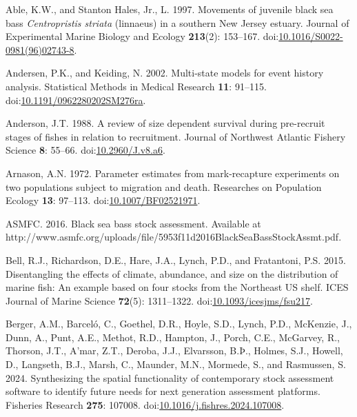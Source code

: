 \documentclass[
]{article}
\newlength{\cslhangindent}
\newlength{\cslentryspacingunit} %
\newenvironment{CSLReferences}[2] %
 {%
  \setlength{\parindent}{0pt}
  \ifodd #1
  \let\oldpar\par
  \def\par{\hangindent=\cslhangindent\oldpar}
  \fi
  \setlength{\parskip}{#2\cslentryspacingunit}
 }%
 {}
\begin{document}
\hypertarget{refs}{}
\begin{CSLReferences}{1}{0}
\leavevmode{}%
Able, K.W., and Stanton Hales, Jr., L. 1997. Movements of juvenile black sea bass \emph{{C}entropristis striata} (linnaeus) in a southern {N}ew {J}ersey estuary. Journal of Experimental Marine Biology and Ecology \textbf{213}(2): 153--167. doi:\href{https://doi.org/10.1016/S0022-0981(96)02743-8}{10.1016/S0022-0981(96)02743-8}.

\leavevmode{}%
Andersen, P.K., and Keiding, N. 2002. Multi-state models for event history analysis. Statistical Methods in Medical Research \textbf{11}: 91--115. doi:\href{https://doi.org/10.1191/0962280202SM276ra}{10.1191/0962280202SM276ra}.

\leavevmode{}%
Anderson, J.T. 1988. A review of size dependent survival during pre-recruit stages of fishes in relation to recruitment. Journal of Northwest Atlantic Fishery Science \textbf{8}: 55--66. doi:\href{https://doi.org/10.2960/J.v8.a6}{10.2960/J.v8.a6}.

\leavevmode{}%
Arnason, A.N. 1972. Parameter estimates from mark-recapture experiments on two populations subject to migration and death. Researches on Population Ecology \textbf{13}: 97--113. doi:\href{https://doi.org/10.1007/BF02521971}{10.1007/BF02521971}.

\leavevmode{}%
ASMFC. 2016. Black sea bass stock assessment. {Available} at http://www.asmfc.org/uploads/file/5953f11d2016BlackSeaBassStockAssmt.pdf.

\leavevmode{}%
Bell, R.J., Richardson, D.E., Hare, J.A., Lynch, P.D., and Fratantoni, P.S. 2015. Disentangling the effects of climate, abundance, and size on the distribution of marine fish: An example based on four stocks from the {N}ortheast {US} shelf. ICES Journal of Marine Science \textbf{72}(5): 1311--1322. doi:\href{https://doi.org/10.1093/icesjms/fsu217}{10.1093/icesjms/fsu217}.

\leavevmode{}%
Berger, A.M., Barceló, C., Goethel, D.R., Hoyle, S.D., Lynch, P.D., McKenzie, J., Dunn, A., Punt, A.E., Methot, R.D., Hampton, J., Porch, C.E., McGarvey, R., Thorson, J.T., A'mar, Z.T., Deroba, J.J., Elvarsson, B.Þ., Holmes, S.J., Howell, D., Langseth, B.J., Marsh, C., Maunder, M.N., Mormede, S., and Rasmussen, S. 2024. Synthesizing the spatial functionality of contemporary stock assessment software to identify future needs for next generation assessment platforms. Fisheries Research \textbf{275}: 107008. doi:\href{https://doi.org/10.1016/j.fishres.2024.107008}{10.1016/j.fishres.2024.107008}.


\end{CSLReferences}
\end{document}
